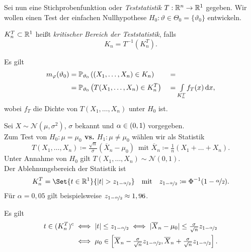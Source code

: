 \documentclass{cheat-sheet}
\renewcommand{\P}{\mathbb{P}} %
\newcommand{\testh}[1]{\textcolor{TestColor}{\textbf{#1}}}
\newcommand{\Normal}{\mathcal{N}} %
\begin{document}

\begin{situation}
  Sei nun eine Stichprobenfunktion oder \emph{Teststatistik} $T : \mathbb{R}^n \to \mathbb{R}^1$ gegeben.
  Wir wollen einen Test der einfachen Nullhypothese $H_0 : \vartheta \in \Theta_0 = \{ \vartheta_0 \}$ entwickeln.
\end{situation}

\begin{defn}
  $K_n^T \subset \mathbb{R}^1$ heißt \emph{kritischer Bereich der Teststatistik}, falls
  \[ K_n = T^{-1}(K_n^T). \]
\end{defn}

\begin{bem}
  Es gilt
  \begin{alignat*}{4}
    m_\varphi(\vartheta_0) &= \P_{\vartheta_0} \left( (X_1, \ldots, X_n) \in K_n \right)
    &&= \\
    &= \P_{\vartheta_0} \left( T(X_1, \ldots, X_n) \in K_n^T \right)
    &&= \Int{K_n^T}{}{f_T(x)}{x},
  \end{alignat*}
  wobei $f_T$ die Dichte von $T(X_1, \ldots, X_n)$ unter $H_0$ ist.
\end{bem}

\begin{test}
  Sei $X \sim \Normal(\mu, \sigma^2)$, $\sigma$ bekannt und $\alpha \in \left( 0, 1 \right)$ vorgegeben. \\
  Zum Test von \testh{$H_0 : \mu = \mu_0$ vs. $H_1 : \mu \neq \mu_0$} wählen wir als Statistik
  \[
    T(X_1, \ldots, X_n) \coloneqq \tfrac{\sqrt{n}}{\sigma} \left( \overline{X}_n - \mu_0 \right) \enspace
    \text{mit }
    \overline{X}_n \coloneqq \tfrac{1}{n} \left( X_1 + \ldots + X_n \right).
  \]
  Unter Annahme von $H_0$ gilt $T(X_1, \ldots, X_n) \sim \Normal(0,1)$. \\
  Der Ablehnungsbereich der Statistik ist
  \[
    K_n^T = \Set{t \in \R^1}{\abs{t} > z_{1 - \nicefrac{\alpha}{2}}}
    \quad \text{mit} \quad
    z_{1 - \nicefrac{\alpha}{2}} \coloneqq \Phi^{-1}(1 - \nicefrac{\alpha}{2}).
  \]
  Für $\alpha = 0,05$ gilt beispielsweise $z_{1 - \nicefrac{\alpha}{2}} \approx 1,96$.
\end{test}


\begin{bem}
  Es gilt
  \begin{align*}
    t \in (K_n^T)^c
    &\iff \lvert t\rvert \leq z_{1-\nicefrac{\alpha}{2}}
    \iff \lvert\overline{X}_n - \mu_0\rvert \leq \tfrac{\sigma}{\sqrt{n}} z_{1-\nicefrac{\alpha}{2}} \\
    &\iff \mu_0 \in \left[ \overline{X}_n - \tfrac{\sigma}{\sqrt{n}} z_{1-\nicefrac{\alpha}{2}}, \overline{X}_n + \tfrac{\sigma}{\sqrt{n}} z_{1-\nicefrac{\alpha}{2}} \right].
  \end{align*}
\end{bem}
\end{document}
